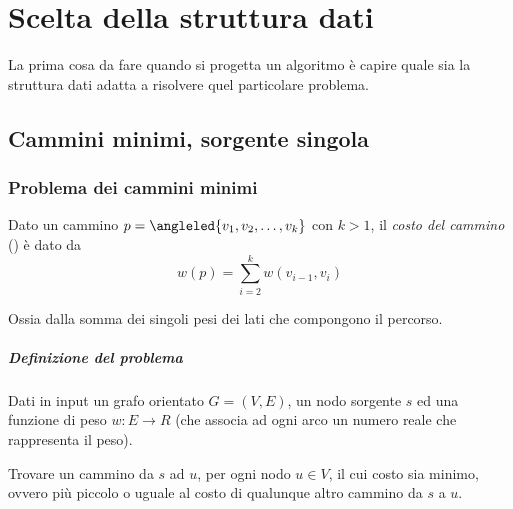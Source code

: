 
\ifsubfile
\pagestyle{plain}
\setcounter{chapter}{13}
\usepackage[
    parfill=30pt, %
]{parskip}


\fi
\chapter{Scelta della struttura dati}

\begin{note}
La prima cosa da fare quando si progetta un algoritmo è capire quale sia la struttura dati adatta a risolvere quel particolare problema.
\end{note}

\section{Cammini minimi, sorgente singola}

\subsection{Problema dei cammini minimi}

\begin{definition}
Dato un cammino \(p = \angleled{v_1, v_2, \ldots, v_k}\) con \(k > 1\), il \emph{costo del cammino} () è dato da
\begin{equation*}
w(p) = \sum_{i=2}^k w(v_{i-1}, v_i)
\end{equation*}
\end{definition}
Ossia dalla somma dei singoli pesi dei lati che compongono il percorso.

\paragraph{Definizione del problema}
Dati in input un grafo orientato \(G = (V, E)\), un nodo sorgente \(s\) ed una funzione di peso \(w \colon E \to R\) (che associa ad ogni arco un numero reale che rappresenta il peso).

Trovare un cammino da \(s\) ad \(u\), per ogni nodo \(u \in V\), il cui costo sia minimo, ovvero più piccolo o uguale al costo di qualunque altro cammino da \(s\) a \(u\).

